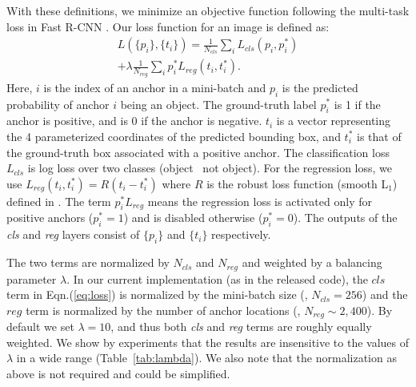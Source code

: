 \documentclass[10pt,journal,cspaper,compsoc]{IEEEtran}
\def\cls{\mathit{cls}}
\def\reg{\mathit{reg}}
\begin{document}
With these definitions, we minimize an objective function following the multi-task loss in Fast R-CNN \cite{Girshick2015a}. Our loss function for an image is defined as:
\begin{equation}\label{eq:loss}
\begin{aligned}
L(\{p_i\}, \{t_i\}) = \frac{1}{N_{\cls}}\sum_i L_{\cls}(p_i, p^{*}_i) \\ + \lambda\frac{1}{N_{\reg}}\sum_i  p^{*}_i L_{\reg}(t_i, t^{*}_i).
\end{aligned}
\end{equation}
Here, $i$ is the index of an anchor in a mini-batch and $p_i$ is the predicted probability of anchor $i$ being an object. The ground-truth label $p^{*}_i$ is 1 if the anchor is positive, and is 0 if the anchor is negative. $t_i$ is a vector representing the 4 parameterized coordinates of the predicted bounding box, and $t^{*}_i$ is that of the ground-truth box associated with a positive anchor.
The classification loss $L_{\cls}$ is log loss over two classes (object \vs~not object).
For the regression loss, we use $L_{\reg}(t_i, t^{*}_i)=R(t_i - t^{*}_i)$ where $R$ is the robust loss function (smooth L$_1$) defined in \cite{Girshick2015a}. The term $p^{*}_i L_{\reg}$ means the regression loss is activated only for positive anchors ($p^{*}_i=1$) and is disabled otherwise ($p^{*}_i=0$). The outputs of the \emph{cls} and \emph{reg} layers consist of $\{p_i\}$ and $\{t_i\}$ respectively.

The two terms are normalized by $N_{\cls}$ and $N_{\reg}$ and weighted by a balancing parameter $\lambda$. In our current implementation (as in the released code), the $cls$ term in Eqn.(\ref{eq:loss}) is normalized by the mini-batch size (\ie, $N_{\cls}=256$) and the $reg$ term is normalized by the number of anchor locations (\ie, $N_{\reg}\sim2,400$). By default we set $\lambda=10$, and thus both \emph{cls} and \emph{reg} terms are roughly equally weighted. We show by experiments that the results are insensitive to the values of $\lambda$ in a wide range (Table~\ref{tab:lambda}).
We also note that the normalization as above is not required and could be simplified.
\end{document}
